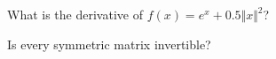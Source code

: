 \documentclass{amsart}
\begin{document}
\begin{category}
\begin{question}[essay]
What is the derivative of $f(x) = e^x + 0.5 \Vert x \Vert^2$?
\end{question}

\begin{question}[multichoice]
Is every symmetric matrix invertible?
\end{question}
\end{category}
\end{document}
